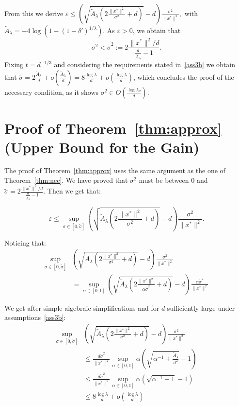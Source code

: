 \begin{subappendices}
\begin{prv*}
%
From this we derive
$\varepsilon \leq \left( \sqrt{ \tilde{A}_\lambda\left(2\frac{\lVert x^*\rVert^2}{\sigma^2}+d\right)}-d \right)\frac{\sigma^2}{\lVert x^*\rVert^2},$ 
with $\tilde{A}_\lambda =-4\log\left(1-(1-\delta')^{1/\lambda}\right)$. 
As $\varepsilon>0$, we obtain that 
$$\sigma^2< \tilde{\sigma}^2 := 2\frac{\lVert x^*\rVert^2/d}{\frac{d}{\bar{A}_\lambda}-1}.$$ 
Fixing $t = d^{-1/3}$ and considering the requirements stated in~\eqref{ass3b} we obtain that 
$\tilde{\sigma}= 2\frac{\tilde{A}_\lambda}{d}+o\left(\frac{\tilde{A}_\lambda}{d}\right)=8 \frac{\log \lambda}{d}+o\left(\frac{\log \lambda}{d}\right)$,
which concludes the proof of the necessary condition, as it shows 
$\sigma^2\in O\left( \frac{\log\lambda_d}{d}\right)$.
\end{prv*}

\section{Proof of Theorem~\ref{thm:approx} (Upper Bound for the Gain)}
\label{sec:approx} 

\begin{prv*}

The proof of Theorem~\ref{thm:approx} uses the same argument as the one of Theorem~\ref{thm:nec}. We have proved that $\sigma^2$ must be between $0$ and $\tilde{\sigma}=2\frac{\lVert x^*\rVert^2/d}{\frac{d}{\bar{A}_\lambda}-1}$. Then  we get that:

$$\varepsilon\leq \sup_{\sigma\in\left[0,\tilde{\sigma}\right]}\left( \sqrt{ \tilde{A}_\lambda\left(2\frac{\lVert x^*\rVert^2}{\sigma^2}+d\right)}-d \right)\frac{\sigma^2}{\lVert x^*\rVert^2}.$$

Noticing that: 
\begin{align*}
    \sup_{\sigma\in\left[0,\tilde{\sigma}\right]}&\left( \sqrt{ \tilde{A}_\lambda\left(2\frac{\lVert x^*\rVert^2}{\sigma^2}+d\right)}-d \right)\frac{\sigma^2}{\lVert x^*\rVert^2} \\
    &= \sup_{\alpha\in\left[0,1\right]}\left( \sqrt{ \tilde{A}_\lambda\left(2\frac{\lVert x^*\rVert^2}{\alpha\tilde{\sigma}^2}+d\right)}-d \right)\frac{\alpha\tilde{\sigma}^2}{\lVert x^*\rVert^2}
\end{align*}

We get after simple algebraic simplifications and for $d$ sufficiently large under assumptions~\eqref{ass3b}:
\begin{align*}
     \sup_{\sigma\in\left[0,\tilde{\sigma}\right]}&\left( \sqrt{ \tilde{A}_\lambda\left(2\frac{\lVert x^*\rVert^2}{\sigma^2}+d\right)}-d \right)\frac{\sigma^2}{\lVert x^*\rVert^2}\\
     &\leq\frac{d\tilde{\sigma}^2}{\lVert x^*\rVert^2} \sup_{\alpha\in\left[0,1\right]}\alpha\left(\sqrt{\alpha^{-1}+\frac{\tilde{A}_\lambda}{d^2}}-1\right)\\
     &\leq\frac{d\tilde{\sigma}^2}{\lVert x^*\rVert^2} \sup_{\alpha\in\left[0,1\right]}\alpha\left(\sqrt{\alpha^{-1}+1}-1\right)\\
     &\leq 8\frac{\log\lambda}{d}+o\left(\frac{\log\lambda}{d}\right)
\end{align*}


\end{prv*}
\end{subappendices}
